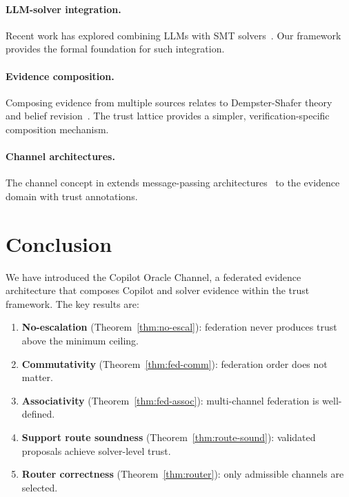 \documentclass[11pt]{article}
\begin{document}
\paragraph{LLM-solver integration.}
Recent work has explored combining LLMs with SMT
solvers~\cite{first2023baldur,yang2024leandojo}.  Our framework
provides the formal foundation for such integration.

\paragraph{Evidence composition.}
Composing evidence from multiple sources relates to
Dempster-Shafer theory~\cite{shafer1976mathematical} and
belief revision~\cite{gardenfors1988knowledge}.  The
\JuGeo{} trust lattice provides a simpler, verification-specific
composition mechanism.

\paragraph{Channel architectures.}
The channel concept in \JuGeo{} extends message-passing
architectures~\cite{milner1999communicating} to the evidence
domain with trust annotations.

\section{Conclusion}
\label{sec:conclusion}

We have introduced the Copilot Oracle Channel, a federated evidence
architecture that composes Copilot and solver evidence within the
\JuGeo{} trust framework.  The key results are:

\begin{enumerate}
\item \textbf{No-escalation} (Theorem~\ref{thm:no-escal}):
  federation never produces trust above the minimum ceiling.

\item \textbf{Commutativity} (Theorem~\ref{thm:fed-comm}):
  federation order does not matter.

\item \textbf{Associativity} (Theorem~\ref{thm:fed-assoc}):
  multi-channel federation is well-defined.

\item \textbf{Support route soundness}
  (Theorem~\ref{thm:route-sound}): validated proposals achieve
  solver-level trust.

\item \textbf{Router correctness} (Theorem~\ref{thm:router}):
  only admissible channels are selected.
\end{enumerate}
\end{document}

